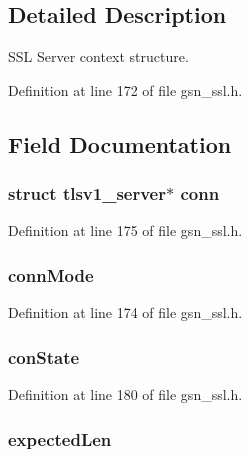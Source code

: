\subsection{Detailed Description}
SSL Server context structure. 

Definition at line 172 of file gsn\_\-ssl.h.



\subsection{Field Documentation}
\hypertarget{a00245_a7ae31f38c448c24fedca2e2980a87058}{
\subsubsection[{conn}]{\setlength{\rightskip}{0pt plus 5cm}struct tlsv1\_\-server$\ast$ {\bf conn}}}
\label{a00245_a7ae31f38c448c24fedca2e2980a87058}


Definition at line 175 of file gsn\_\-ssl.h.

\hypertarget{a00245_aeff852947f5fd4b9b609d3ef04ebe22a}{
\subsubsection[{connMode}]{ {\bf connMode}}}
\label{a00245_aeff852947f5fd4b9b609d3ef04ebe22a}


Definition at line 174 of file gsn\_\-ssl.h.

\hypertarget{a00245_acb69cb3fa328edc1fb385aa446668bdd}{
\subsubsection[{conState}]{ {\bf conState}}}
\label{a00245_acb69cb3fa328edc1fb385aa446668bdd}


Definition at line 180 of file gsn\_\-ssl.h.

\hypertarget{a00245_a1a40ca49a468072350c826dc4132855a}{
\subsubsection[{expectedLen}]{ {\bf expectedLen}}}
\label{a00245_a1a40ca49a468072350c826dc4132855a}


